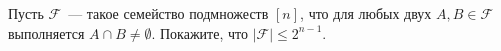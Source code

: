 Пусть $\mathcal{F}$~--- такое семейство подмножеств $[n]$, что для любых двух $A, B \in \mathcal{F}$
выполняется $A \cap B \neq \emptyset$. Покажите, что $|\mathcal{F}| \le 2^{n - 1}$.
